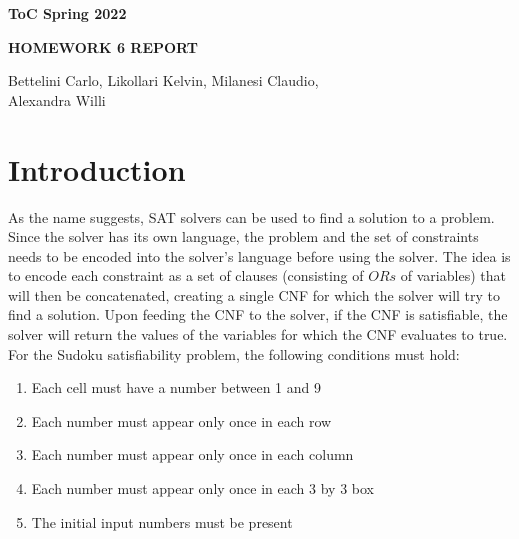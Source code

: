 \documentclass[12pt,a4paper]{article}
\begin{document}
\begin{center}

  \bigskip \bigskip

  {\large \textbf{ToC Spring 2022}}

   \bigskip


   {\large \textbf{HOMEWORK 6 REPORT}}







  \bigskip \bigskip


  {\large Bettelini Carlo, Likollari Kelvin, Milanesi Claudio, \\
  Alexandra Willi
  }

   \bigskip



  \bigskip \bigskip



  \bigskip \bigskip

\end{center}

\section*{Introduction}

As the name suggests, SAT solvers can be used to find a solution to a problem. Since the solver has its own language, the problem and the set of constraints needs to be encoded into the solver's language before using the solver.
The idea is to encode each constraint as a set of clauses (consisting of $ORs$ of variables) that will then be concatenated, creating a single CNF for which the solver will try to find a solution.
Upon feeding the CNF to the solver, if the CNF is satisfiable, the solver will return the values of the variables for which the CNF evaluates to true.
For the Sudoku satisfiability problem, the following conditions must hold:
\begin{enumerate}
  \item Each cell must have a number  between 1 and 9
  \item Each number must appear only once in each row
  \item Each number must appear only once in each column
  \item Each number must appear only once in each 3 by 3 box
  \item The initial input numbers must be present
\end{enumerate}
\end{document}
